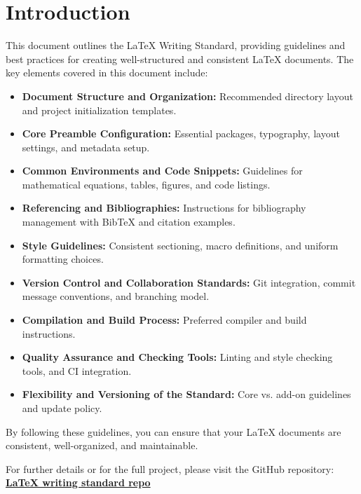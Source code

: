 \section{Introduction}

This document outlines the LaTeX Writing Standard, providing guidelines and best practices for creating well-structured and consistent LaTeX documents. The key elements covered in this document include:

\begin{itemize}
    \item \textbf{Document Structure and Organization:} Recommended directory layout and project initialization templates.
    \item \textbf{Core Preamble Configuration:} Essential packages, typography, layout settings, and metadata setup.
    \item \textbf{Common Environments and Code Snippets:} Guidelines for mathematical equations, tables, figures, and code listings.
    \item \textbf{Referencing and Bibliographies:} Instructions for bibliography management with BibTeX and citation examples.
    \item \textbf{Style Guidelines:} Consistent sectioning, macro definitions, and uniform formatting choices.
    \item \textbf{Version Control and Collaboration Standards:} Git integration, commit message conventions, and branching model.
    \item \textbf{Compilation and Build Process:} Preferred compiler and build instructions.
    \item \textbf{Quality Assurance and Checking Tools:} Linting and style checking tools, and CI integration.
    \item \textbf{Flexibility and Versioning of the Standard:} Core vs. add-on guidelines and update policy.
\end{itemize}

By following these guidelines, you can ensure that your LaTeX documents are consistent, well-organized, and maintainable.

For further details or for the full project, please visit the GitHub repository: \href{https://github.com/jerujj/latex_writing_standard}{\textbf{LaTeX writing standard repo}}

